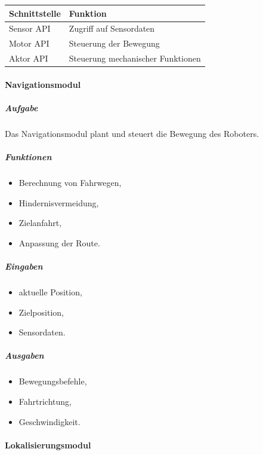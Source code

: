 \begin{longtable}[]{@{}ll@{}}
\toprule\noalign{}
Schnittstelle & Funktion \\
\midrule\noalign{}
\endhead
\bottomrule\noalign{}
\endlastfoot
Sensor API & Zugriff auf Sensordaten \\
Motor API & Steuerung der Bewegung \\
Aktor API & Steuerung mechanischer Funktionen \\
\end{longtable}

\paragraph{Navigationsmodul}\label{navigationsmodul}

\subparagraph{Aufgabe}\label{aufgabe-7}

Das Navigationsmodul plant und steuert die Bewegung des Roboters.

\subparagraph{Funktionen}\label{funktionen-1}

\begin{itemize}
\tightlist
\item
  Berechnung von Fahrwegen,
\item
  Hindernisvermeidung,
\item
  Zielanfahrt,
\item
  Anpassung der Route.
\end{itemize}

\subparagraph{Eingaben}\label{eingaben}

\begin{itemize}
\tightlist
\item
  aktuelle Position,
\item
  Zielposition,
\item
  Sensordaten.
\end{itemize}

\subparagraph{Ausgaben}\label{ausgaben}

\begin{itemize}
\tightlist
\item
  Bewegungsbefehle,
\item
  Fahrtrichtung,
\item
  Geschwindigkeit.
\end{itemize}

\paragraph{Lokalisierungsmodul}\label{lokalisierungsmodul}

